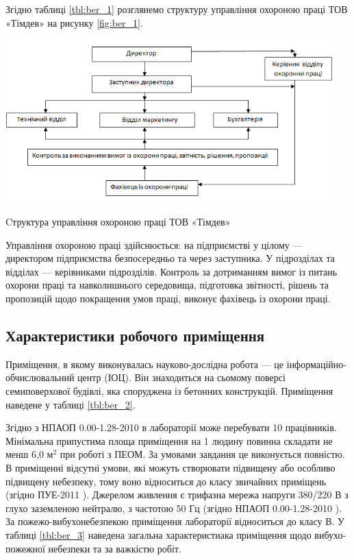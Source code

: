 Згідно таблиці \ref{tbl:ber_1} розглянемо структуру управління охороною праці ТОВ «Тімдев» на рисунку \ref{fig:ber_1}.

\begin{stdfigure}
\includegraphics[width=5in]{images/ber1.png}
\caption{Cтруктура управління охороною праці ТОВ «Тімдев»}
\label{fig:ber_1}
\end{stdfigure}   

Управління охороною праці здійснюється: на підприємстві у цілому --- директором підприємства безпосередньо та через заступника. У підрозділах та відділах --- керівниками підрозділів. Контроль за дотриманням вимог із питань охорони праці та навколишнього середовища, підготовка звітності, рішень та пропозицій щодо покращення умов праці, виконує фахівець із охорони праці.

\subsection{Характеристики робочого приміщення}

Приміщення, в якому виконувалась науково-дослідна робота --- це інформаційно-обчислювальний центр (ІОЦ). Він знаходиться на сьомому поверсі семиповерхової будівлі, яка споруджена із бетонних конструкцій. Приміщення наведене у таблиці \ref{tbl:ber_2}.

Згідно з НПАОП 0.00-1.28-2010 \cite{ber3} в лабораторії може перебувати 10 працівників. Мінімальна припустима площа приміщення на 1 людину повинна складати не менш 6,0 $\text{м}^\text{2}$ при роботі з ПЕОМ. За умовами завдання це виконується повністю. В приміщенні відсутні умови, які можуть створювати підвищену або особливо підвищену небезпеку, тому воно відноситься до класу звичайних приміщень (згідно ПУЕ-2011 \cite{ber4}). Джерелом живлення є трифазна мережа напруги 380/220 В з глухо заземленою нейтралю, з частотою 50 Гц (згідно НПАОП 0.00-1.28-2010 \cite{ber3}). За пожежо-вибухонебезпекою приміщення лабораторії відноситься до класу В. У таблиці \ref{tbl:ber_3} наведена загальна характеристиака приміщення щодо вибухо-пожежної небезпеки та за важкістю робіт. 

